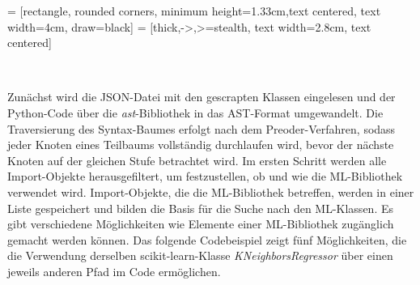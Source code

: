 \documentclass[german,bachelor]{swsLeipzig}
\begin{document}
 = [rectangle, rounded corners, minimum height=1.33cm,text centered, text width=4cm, draw=black]
 = [thick,->,>=stealth, text width=2.8cm, text centered]

\begin{center}
\end{center}
\

\noindent Zunächst wird die JSON-Datei mit den gescrapten Klassen eingelesen und der Python-Code über die \textit{ast}-Bibliothek in das AST-Format umgewandelt.
Die Traversierung des Syntax-Baumes erfolgt nach dem Preoder-Verfahren, sodass jeder Knoten eines Teilbaums vollständig
durchlaufen wird, bevor der nächste Knoten auf der gleichen Stufe betrachtet wird.
Im ersten Schritt werden alle Import-Objekte herausgefiltert, um festzustellen, ob und wie die ML-Bibliothek verwendet wird.
Import-Objekte, die die ML-Bibliothek betreffen, werden in einer Liste gespeichert und bilden die Basis für die Suche nach
den ML-Klassen.
Es gibt verschiedene Möglichkeiten wie Elemente einer ML-Bibliothek zugänglich gemacht werden können.
Das folgende Codebeispiel zeigt fünf Möglichkeiten, die die Verwendung derselben scikit-learn-Klasse \textit{KNeighborsRegressor}
über einen jeweils anderen Pfad im Code ermöglichen. \\
\end{document}

